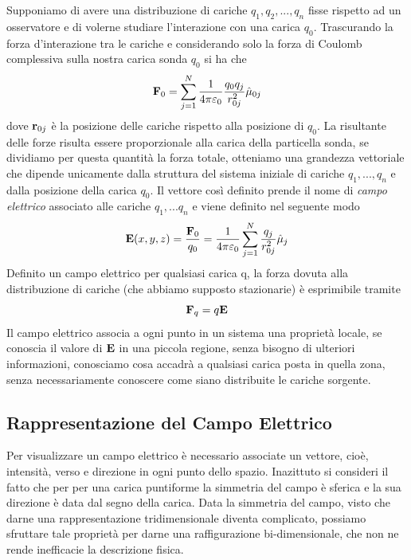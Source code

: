 Supponiamo di avere una distribuzione di cariche $q_1,q_2,...,q_n$ fisse rispetto ad un osservatore e di volerne studiare l'interazione con una carica $q_0$. Trascurando la forza d'interazione tra le cariche e considerando solo la forza di Coulomb complessiva sulla nostra carica sonda $q_0$ si ha che 
\begin{equation*}
	\bold{F}_{0} = \sum_{j=1}^N \frac{1}{4 \pi \varepsilon_0}\frac{q_0q_j}{r_{0j}^2}\hat{\mu}_{0j}
\end{equation*}
dove $\bold{r}_{0j}$ \`e la posizione delle cariche rispetto alla posizione di $q_0$. La risultante delle forze risulta essere proporzionale alla carica della particella sonda, se dividiamo per questa quantit\`a la forza totale, otteniamo una grandezza vettoriale che dipende unicamente dalla struttura del sistema iniziale di cariche $q_1,...,q_n$ e dalla posizione della carica $q_0$. Il vettore cos\`i definito prende il nome di \textit{campo elettrico} associato alle cariche $q_1,...q_n$ e viene definito nel seguente modo
\begin{equation}
	\bold{E}(x,y,z) = \frac{\bold{F}_{0}}{q_0} = \frac{1}{4 \pi \varepsilon_0}\sum_{j=1}^N \frac{q_j}{r_{0j}^2}\hat{\mu}_j
\end{equation}
Definito un campo elettrico per qualsiasi carica q, la forza dovuta alla distribuzione di cariche (che abbiamo supposto stazionarie) \`e esprimibile tramite 
\begin{equation*}
	\bold{F}_{q} = q \bold{E}
\end{equation*}
Il campo elettrico associa a ogni punto in un sistema una propriet\`a locale, se conoscia il valore di $\bold{E}$ in una piccola regione, senza bisogno di ulteriori informazioni, conosciamo cosa accadr\`a a qualsiasi carica posta in quella zona, senza necessariamente conoscere come siano distribuite le cariche sorgente.

\subsection{Rappresentazione del Campo Elettrico}

Per visualizzare un campo elettrico \`e necessario associate un vettore, cio\`e, intensit\`a, verso e direzione in ogni punto dello spazio. Inazittuto si consideri il fatto che per per una carica puntiforme la simmetria del campo \`e sferica e la sua direzione \`e data dal segno della carica. Data la simmetria del campo, visto che darne una rappresentazione tridimensionale diventa complicato, possiamo sfruttare tale propriet\`a per darne una raffigurazione bi-dimensionale, che non ne rende inefficacie la descrizione fisica.
\\

